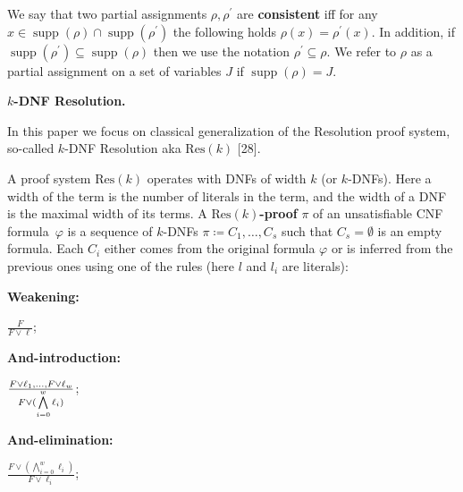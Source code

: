 We say that two partial assignments $\rho,\rho^{\prime}$ are \textbf{consistent} iff for any $x\in\operatorname*{supp}(\rho)\cap\operatorname*{supp}(\rho^{\prime})$ the following holds $\rho(x)=\rho^{\prime}(x)$. In addition, if $\operatorname*{supp}(\rho^{\prime})\subseteq\operatorname*{supp}(\rho)$ then we use the notation $\rho^{\prime}\subseteq\rho$. We refer to $\rho$ as a partial assignment
on a set of variables $J$ if $\operatorname*{supp}(\rho)=J$.\par




\par\medskip\noindent\textbf{
$k$-DNF Resolution.}\par




In this paper we focus on classical generalization of the Resolution
proof system, so-called $k$-DNF Resolution aka $\mathrm{Res}(k)$ [28].\par




A proof system $\mathrm{Res}(k)$ operates with DNFs of width $k$ (or $k$-DNFs). Here a width of the term is
the number of literals in the term, and the width of a DNF is the maximal width of its terms. A $\mathrm{Res}(k)$\textbf{-proof} $\pi$
of an unsatisfiable CNF formula $\varphi$ is a sequence of $k$-DNFs $\pi\coloneqq C_{1},\dots,C_{s}$
such that $C_{s}=\emptyset$ is an empty formula. Each $C_{i}$ either comes from the original formula
$\varphi$ or is inferred from the previous ones using one of the rules (here $l$ and $l_{i}$ are literals):\par


\textbf{Weakening:}



$\frac{F}{F\vee\ell}$;\par



\textbf{And}\textbf{-introduction:}



$\frac{F\vee\ell_{1},\dots,F\vee\ell_{w}}{F\vee(\bigwedge\limits_{i=0}^{w}\ell_%
{i})}$;\par



\textbf{And}\textbf{-elimination:}



$\frac{F\vee(\bigwedge\limits_{i=0}^{w}\ell_{i})}{F\vee\ell_{i}}$;\par



